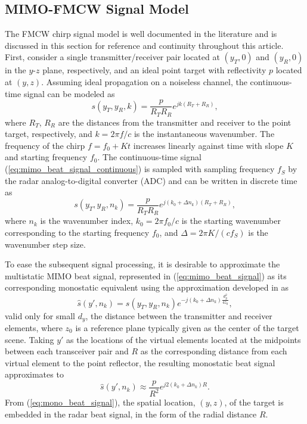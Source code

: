 \documentclass[10pt,journal,final]{IEEEtran}
\begin{document}
\subsection{MIMO-FMCW Signal Model}
\label{subsec:signal_model}
The FMCW chirp signal model is well documented in the literature \cite{ti:intro_to_FMCW_radars,josiah:isar,muhammet:sparse} and is discussed in this section for reference and continuity throughout this article.
First, consider a single transmitter/receiver pair located at $(y_T,0)$ and $(y_R,0)$ in the $y$-$z$ plane, respectively, and an ideal point target with reflectivity $p$ located at $(y,z)$.
Assuming ideal propagation on a noiseless channel, the continuous-time signal can be modeled as
\begin{equation}
\label{eq:mimo_beat_signal_continuous}
    s(y_T,y_R,k) = \frac{p}{R_T R_R} e^{jk(R_T + R_R)},
\end{equation}
where $R_T$, $R_R$ are the distances from the transmitter and receiver to the point target, respectively, and $k = 2\pi f/c$ is the instantaneous wavenumber.
The frequency of the chirp $f = f_0 + Kt$ increases linearly against time with slope $K$ and starting frequency $f_0$.
The continuous-time signal (\ref{eq:mimo_beat_signal_continuous}) is sampled with sampling frequency $f_S$ by the radar analog-to-digital converter (ADC) and can be written in discrete time as
\begin{equation}
	\label{eq:mimo_beat_signal}
	s(y_T,y_R,n_k) = \frac{p}{R_T R_R} e^{j(k_0 + \Delta n_k)(R_T + R_R)},
\end{equation}
where $n_k$ is the wavenumber index, $k_0 = 2\pi f_0/c$ is the starting wavenumber corresponding to the starting frequency $f_0$, and $\Delta = 2\pi K /(c f_S)$ is the wavenumber step size.

To ease the subsequent signal processing, it is desirable to approximate the multistatic MIMO beat signal, represented in (\ref{eq:mimo_beat_signal}) as its corresponding monostatic equivalent using the approximation developed in \cite{muhammet:testbeds} as
\begin{equation}
	\label{eq:mult-to-mono}
	\hat{s}(y',n_k) = s(y_T,y_R,n_k) e^{-j(k_0 + \Delta n_k)\frac{d_y^2}{4z_0}},
\end{equation}
valid only for small $d_y$, the distance between the transmitter and receiver elements, where $z_0$ is a reference plane typically given as the center of the target scene. 
Taking $y'$ as the locations of the virtual elements located at the midpoints between each transceiver pair and $R$ as the corresponding distance from each virtual element to the point reflector, the resulting monostatic beat signal approximates to
\begin{equation}
	\label{eq:mono_beat_signal}
	\hat{s}(y',n_k) \approx \frac{p}{R^2}e^{j2(k_0 + \Delta n_k)R}.
\end{equation}
From (\ref{eq:mono_beat_signal}), the spatial location, $(y,z)$, of the target is embedded in the radar beat signal, in the form of the radial distance $R$.
\end{document}
